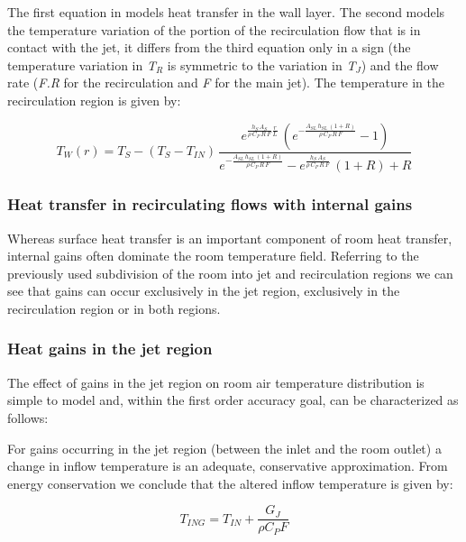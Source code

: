 {The first equation in models heat transfer in the wall layer. The second models the temperature variation of the portion of the recirculation flow that is in contact with the jet, it differs from the third equation only in a sign (the temperature variation in \emph{T\(_{R}\)} is symmetric to the variation in \emph{T\(_{J}\)}) and the flow rate (\emph{F.R} for the recirculation and \emph{F} for the main jet). The temperature in the recirculation region is given by:

\begin{equation}
{T_W}(r) = {T_S} - ({T_S} - {T_{IN}})\,\frac{{{e^{\frac{{{h_S}\,{A_S}}}{{\rho \,{C_P}\,R\,F}}\frac{r}{{{L_{}}}}}}\,({e^{ - \frac{{{A_{SL}}\,{h_{SL}}\,(1 + R)}}{{\rho \,{C_P}\,R\,F}}}} - 1)}}{{{e^{ - \frac{{{A_{SL}}\,{h_{SL}}\,(1 + R)}}{{\rho \,{C_P}\,R\,F}}}} - {e^{\frac{{{h_S}\,{A_S}}}{{\rho \,{C_P}\,R\,F}}}}\,(1 + R) + R}}
\end{equation}

\subsubsection{Heat transfer in recirculating flows with internal gains}\label{heat-transfer-in-recirculating-flows-with-internal-gains}

Whereas surface heat transfer is an important component of room heat transfer, internal gains often dominate the room temperature field. Referring to the previously used subdivision of the room into jet and recirculation regions we can see that gains can occur exclusively in the jet region, exclusively in the recirculation region or in both regions.

\subsubsection{Heat gains in the jet region}\label{heat-gains-in-the-jet-region}

The effect of gains in the jet region on room air temperature distribution is simple to model and, within the first order accuracy goal, can be characterized as follows:

For gains occurring in the jet region (between the inlet and the room outlet) a change in inflow temperature is an adequate, conservative approximation. From energy conservation we conclude that the altered inflow temperature is given by:

\begin{equation}
{T_{ING}} = {T_{IN}} + \frac{{{G_J}}}{{\rho {C_P}F}}
\end{equation}

}
